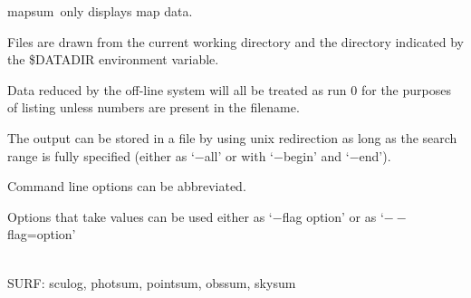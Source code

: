 \documentclass[twoside,11pt]{article}
\newcommand{\task}[1]{{\sf #1}}
\newcommand{\sculog}{\htmlref{\task{sculog}}{SCULOG}}
\newcommand{\photsum}{\htmlref{\task{photsum}}{PHOTSUM}}
\newcommand{\mapsum}{\htmlref{\task{mapsum}}{MAPSUM}}
\newcommand{\skysum}{\htmlref{\task{skysum}}{SKYSUM}}
\newcommand{\pointsum}{\htmlref{\task{pointsum}}{POINTSUM}}
\newcommand{\obssum}{\htmlref{\task{obssum}}{OBSSUM}}
\newcommand{\htmlref}[2]{#1}
\renewcommand{\_}{\texttt{\symbol{95}}}
\newcommand{\sstdiytopic}[2]{\item[{\hspace{-0.35em}#1\hspace{-0.35em}:}]
\mbox{} \\[1.3ex] #2}
\newcommand{\sstitem}{\item}
\newcommand{\sstdiytopic}[2]{\item[{#1}] #2 }
\newcommand{\sstitem}{\item}
\begin{document}
{{{         \sstitem
         \mapsum\ only displays map data.

         \sstitem
         Files are drawn from the current working directory and the directory
           indicated by the \$DATADIR environment variable.    %

         \sstitem
         Data reduced by the off-line system will all be treated as
           run 0 for the purposes of listing unless numbers are present
           in the filename.

         \sstitem
         The output can be stored in a file by using unix redirection as
           long as the search range is fully specified (either as `$-$all' or
           with `$-$begin' and `$-$end').

         \sstitem
         Command line options can be abbreviated.

         \sstitem
         Options that take values can be used either as `$-$flag option' or
         as `$--$flag=option'
      }
   }
   \sstdiytopic{
      Related Applications
   }{
      SURF: \sculog, \photsum, \pointsum, \obssum, \skysum
   }
}
\end{document}
